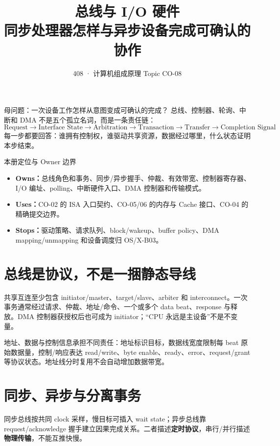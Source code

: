 \documentclass[UTF8,fontset=fandol,11pt,a4paper]{ctexart}
\title{\vspace{-1.1cm}\textbf{总线与 I/O 硬件}\\[0.4em]\large 同步处理器怎样与异步设备完成可确认的协作}
\author{408 · 计算机组成原理 Topic CO-08}
\date{}
\newcommand{\kw}[1]{\textbf{\color{deep}#1}}
\begin{document}
\maketitle

\begin{corebox}{母问题：一次设备工作怎样从意图变成可确认的完成？}
总线、控制器、轮询、中断和 DMA 不是五个孤立名词，而是一条责任链：
\[
\boxed{\text{Request}\to\text{Interface State}\to\text{Arbitration}\to\text{Transaction}\to\text{Transfer}\to\text{Completion Signal}}
\]
每一步都要回答：谁拥有控制权，谁驱动共享资源，数据经过哪里，什么状态证明本步结束。
\end{corebox}

\begin{methodbox}{本册定位与 Owner 边界}
\begin{itemize}
\item \kw{Owns：}总线角色和事务、同步/异步握手、仲裁、有效带宽、控制器寄存器、I/O 编址、polling、中断硬件入口、DMA 控制器和传输模式。
\item \kw{Uses：}CO-02 的 ISA 入口契约、CO-05/06 的内存与 Cache 接口、CO-04 的精确提交边界。
\item \kw{Stops：}驱动策略、请求队列、block/wakeup、buffer policy、DMA mapping/unmapping 和设备调度归 OS/X-B03。
\end{itemize}
\end{methodbox}

\tableofcontents
\newpage

\section{总线是协议，不是一捆静态导线}
共享互连至少包含 initiator/master、target/slave、arbiter 和 interconnect。一次事务通常经过请求、仲裁、地址/命令、一个或多个 data beat、response 与释放。DMA 控制器获授权后也可成为 initiator；“CPU 永远是主设备”不是不变量。

地址、数据与控制信息承担不同责任：地址标识目标，数据线宽度限制每 beat 原始数据量，控制/响应表达 read/write、byte enable、ready、error、request/grant 等协议状态。地址线分时复用不会自动增加数据带宽。

\section{同步、异步与分离事务}
同步总线按共同 clock 采样，慢目标可插入 wait state；异步总线靠 request/acknowledge 握手建立因果完成关系。二者描述\kw{定时协议}，串行/并行描述\kw{物理传输}，不能互推快慢。
\end{document}
